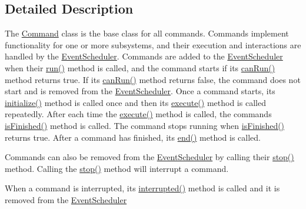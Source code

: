 \subsection{Detailed Description}
The \mbox{\hyperlink{classlib_iterative_robot_1_1_command}{Command}} class is the base class for all commands. Commands implement functionality for one or more subsystems, and their execution and interactions are handled by the \mbox{\hyperlink{classlib_iterative_robot_1_1_event_scheduler}{Event\+Scheduler}}. Commands are added to the \mbox{\hyperlink{classlib_iterative_robot_1_1_event_scheduler}{Event\+Scheduler}} when their \mbox{\hyperlink{classlib_iterative_robot_1_1_command_a3f3790d1b8033d7253a9f44481032ee9}{run()}} method is called, and the command starts if its \mbox{\hyperlink{classlib_iterative_robot_1_1_command_aebef0fdf029a15ee48fbb778c4265609}{can\+Run()}} method returns true. If its \mbox{\hyperlink{classlib_iterative_robot_1_1_command_aebef0fdf029a15ee48fbb778c4265609}{can\+Run()}} method returns false, the command does not start and is removed from the \mbox{\hyperlink{classlib_iterative_robot_1_1_event_scheduler}{Event\+Scheduler}}. Once a command starts, its \mbox{\hyperlink{classlib_iterative_robot_1_1_command_a14543c9d38b07e52f9ffb2af88a63f60}{initialize()}} method is called once and then its \mbox{\hyperlink{classlib_iterative_robot_1_1_command_a4b38164af1a8645fae2fdae296317cf4}{execute()}} method is called repeatedly. After each time the \mbox{\hyperlink{classlib_iterative_robot_1_1_command_a4b38164af1a8645fae2fdae296317cf4}{execute()}} method is called, the command\textquotesingle{}s \mbox{\hyperlink{classlib_iterative_robot_1_1_command_a8e4dccdd88f432a716090f532ba097f7}{is\+Finished()}} method is called. The command stops running when \mbox{\hyperlink{classlib_iterative_robot_1_1_command_a8e4dccdd88f432a716090f532ba097f7}{is\+Finished()}} returns true. After a command has finished, its \mbox{\hyperlink{classlib_iterative_robot_1_1_command_ab30847f09859387b70bb7846f7ce7ca4}{end()}} method is called.

Commands can also be removed from the \mbox{\hyperlink{classlib_iterative_robot_1_1_event_scheduler}{Event\+Scheduler}} by calling their \mbox{\hyperlink{classlib_iterative_robot_1_1_command_ac91308101424f447f80665244b554171}{stop()}} method. Calling the \mbox{\hyperlink{classlib_iterative_robot_1_1_command_ac91308101424f447f80665244b554171}{stop()}} method will interrupt a command.

When a command is interrupted, its \mbox{\hyperlink{classlib_iterative_robot_1_1_command_a1c17b601d1b69822cabadb92069d1747}{interrupted()}} method is called and it is removed from the \mbox{\hyperlink{classlib_iterative_robot_1_1_event_scheduler}{Event\+Scheduler}}

